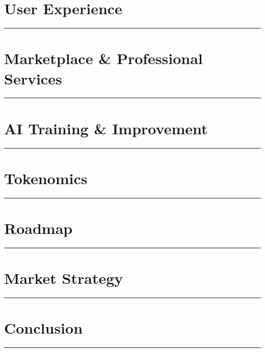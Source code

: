\documentclass[11pt,a4paper]{article}
\newcommand{\sectionrule}{\noindent\rule{\linewidth}{0.8pt}}
\begin{document}
\section{User Experience}
\sectionrule


\section{Marketplace \& Professional Services}
\sectionrule


\section{AI Training \& Improvement}
\sectionrule


\section{Tokenomics}
\sectionrule


\section{Roadmap}
\sectionrule


\section{Market Strategy}
\sectionrule


\section{Conclusion}
\sectionrule

\end{document}
